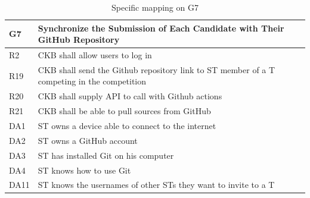   \begin{table}[H]
    \begin{longtable}{|l|p{12cm}|}
      \hline
      \textbf{G7} & \textbf{Synchronize the Submission of Each Candidate with Their GitHub Repository}      \\
      \hline
      R2 & CKB shall allow users to log in \\
      \hline
      R19 & CKB shall send the Github repository link to ST member of a T competing in the competition \\
      \hline
      R20 & CKB shall supply API to call with Github actions \\
      \hline
      R21 & CKB shall be able to pull sources from GitHub \\
      \hline
      DA1 & ST owns a device able to connect to the internet \\
      \hline
      DA2 & ST owns a GitHub account \\
      \hline
      DA3 & ST has installed Git on his computer \\
      \hline
      DA4 & ST knows how to use Git \\
      \hline
      DA11 & ST knows the usernames of other STs they want to invite to a T \\
      \hline
    \end{longtable}
    \caption{Specific mapping on G7}
    \label{tab:mappingG7}
  \end{table}

